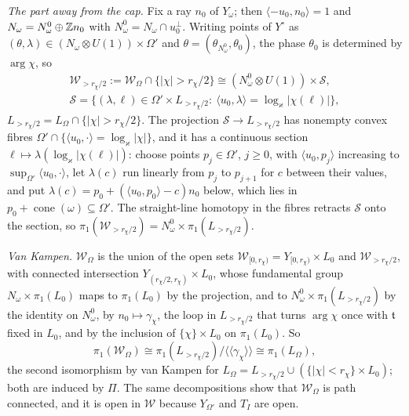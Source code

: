\emph{The part away from the cap.} Fix a ray $n_0$ of $Y_\omega$; then $\langle -u_0,n_0\rangle=1$ and $N_\omega=N^0_\omega\oplus\mathbb Z n_0$ with $N^0_\omega=N_\omega\cap u_0^\perp$. Writing points of $Y^\circ$ as $(\theta,\lambda)\in(N_\omega\otimes U(1))\times \Omega'$ and $\theta=(\theta_{N^0_\omega},\theta_0)$, the phase $\theta_0$ is determined by $\arg\chi$, so
\begin{gather*}
\mathscr W_{>r_\chi/2}:=\mathscr W_\Omega\cap\{|\chi|>r_\chi/2\}\cong(N^0_\omega\otimes U(1))\times \mathcal S,\\
\mathcal S=\{(\lambda,\ell)\in \Omega'\times L_{>r_\chi/2}:\ \langle u_0,\lambda\rangle=\log_\varkappa|\chi(\ell)|\},
\end{gather*}
$L_{>r_\chi/2}=L_\Omega\cap\{|\chi|>r_\chi/2\}$. The projection $\mathcal S\to L_{>r_\chi/2}$ has nonempty convex fibres $\Omega'\cap\{\langle u_0,\cdot\rangle=\log_\varkappa|\chi|\}$, and it has a continuous section $\ell\mapsto\lambda(\log_\varkappa|\chi(\ell)|)$: choose points $p_j\in \Omega'$, $j\ge0$, with $\langle u_0,p_j\rangle$ increasing to $\sup_{\Omega'}\langle u_0,\cdot\rangle$, let $\lambda(c)$ run linearly from $p_j$ to $p_{j+1}$ for $c$ between their values, and put $\lambda(c)=p_0+(\langle u_0,p_0\rangle-c)n_0$ below, which lies in $p_0+\operatorname{cone}(\omega)\subseteq \Omega'$. The straight-line homotopy in the fibres retracts $\mathcal S$ onto the section, so $\pi_1(\mathscr W_{>r_\chi/2})=N^0_\omega\times\pi_1(L_{>r_\chi/2})$.

\emph{Van Kampen.} $\mathscr W_\Omega$ is the union of the open sets $\mathscr W_{[0,r_\chi)}=Y_{[0,r_\chi)}\times L_0$ and $\mathscr W_{>r_\chi/2}$, with connected intersection $Y_{(r_\chi/2,r_\chi)}\times L_0$, whose fundamental group $N_\omega\times\pi_1(L_0)$ maps to $\pi_1(L_0)$ by the projection, and to $N^0_\omega\times\pi_1(L_{>r_\chi/2})$ by the identity on $N^0_\omega$, by $n_0\mapsto\gamma_\chi$, the loop in $L_{>r_\chi/2}$ that turns $\arg\chi$ once with $\mathfrak t$ fixed in $L_0$, and by the inclusion of $\{\chi\}\times L_0$ on $\pi_1(L_0)$. So
\[
\pi_1(\mathscr W_\Omega)\cong\pi_1(L_{>r_\chi/2})/\langle\!\langle\gamma_\chi\rangle\!\rangle\cong\pi_1(L_\Omega),
\]
the second isomorphism by van Kampen for $L_\Omega=L_{>r_\chi/2}\cup(\{|\chi|<r_\chi\}\times L_0)$; both are induced by $\Pi$. The same decompositions show that $\mathscr W_\Omega$ is path connected, and it is open in $\mathscr W$ because $Y_{\Omega'}$ and $T_I$ are open.

